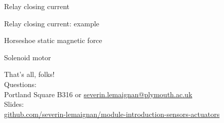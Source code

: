 \documentclass[compress]{beamer}
\begin{document}
{
    \begin{frame}{Relay closing current}
    \end{frame}
}

{
    \begin{frame}{Relay closing current: example}
    \end{frame}
}

{
    \begin{frame}{Horseshoe static magnetic force}
    \end{frame}
}

{
    \begin{frame}{Solenoid motor}
    \end{frame}
}


\begin{frame}{}
    \begin{center}
        \Large
        That's all, folks!\\[2em]
        \normalsize
        Questions:\\
        Portland Square B316 or \url{severin.lemaignan@plymouth.ac.uk} \\[1em]

        Slides:\\
        \href{https://github.com/severin-lemaignan/module-mobile-and-humanoid-robots}{\small
        github.com/severin-lemaignan/module-introduction-sensors-actuators}


    \end{center}
\end{frame}
\end{document}
